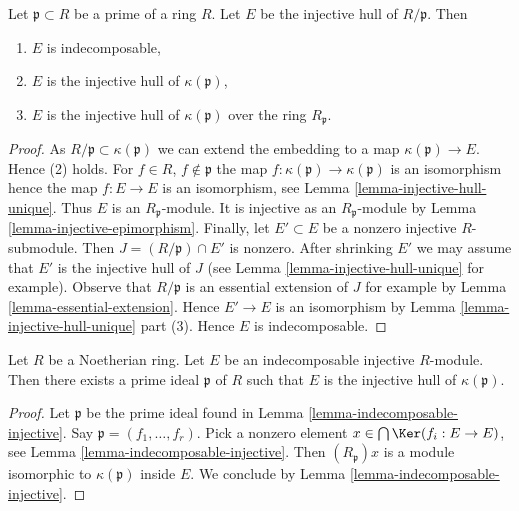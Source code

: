 \begin{lemma}
\label{lemma-injective-hull-indecomposable}
Let $\mathfrak p \subset R$ be a prime of a ring $R$.
Let $E$ be the injective hull of $R/\mathfrak p$. Then
\begin{enumerate}
\item $E$ is indecomposable,
\item $E$ is the injective hull of $\kappa(\mathfrak p)$,
\item $E$ is the injective hull of $\kappa(\mathfrak p)$
over the ring $R_\mathfrak p$.
\end{enumerate}
\end{lemma}

\begin{proof}
As $R/\mathfrak p \subset \kappa(\mathfrak p)$ we can extend the embedding
to a map $\kappa(\mathfrak p) \to E$. Hence (2) holds.
For $f \in R$, $f \not \in \mathfrak p$
the map $f : \kappa(\mathfrak p) \to \kappa(\mathfrak p)$ is an isomorphism
hence the map $f : E \to E$ is an isomorphism,
see Lemma \ref{lemma-injective-hull-unique}.
Thus $E$ is an $R_\mathfrak p$-module. It is injective
as an $R_\mathfrak p$-module by Lemma \ref{lemma-injective-epimorphism}.
Finally, let $E' \subset E$ be a nonzero injective $R$-submodule.
Then $J = (R/\mathfrak p) \cap E'$ is nonzero. After shrinking $E'$
we may assume that $E'$ is the injective hull of $J$ (see
Lemma \ref{lemma-injective-hull-unique} for example).
Observe that $R/\mathfrak p$ is an essential extension of $J$ for example by
Lemma \ref{lemma-essential-extension}. Hence $E' \to E$
is an isomorphism by Lemma \ref{lemma-injective-hull-unique} part (3).
Hence $E$ is indecomposable.
\end{proof}

\begin{lemma}
\label{lemma-indecomposable-injective-noetherian}
Let $R$ be a Noetherian ring. Let $E$ be an indecomposable injective
$R$-module. Then there exists a prime ideal $\mathfrak p$ of $R$ such that
$E$ is the injective hull of $\kappa(\mathfrak p)$.
\end{lemma}

\begin{proof}
Let $\mathfrak p$ be the prime ideal found in
Lemma \ref{lemma-indecomposable-injective}.
Say $\mathfrak p = (f_1, \ldots, f_r)$.
Pick a nonzero element $x \in \bigcap \Ker(f_i : E \to E)$,
see Lemma \ref{lemma-indecomposable-injective}.
Then $(R_\mathfrak p)x$ is a module isomorphic to $\kappa(\mathfrak p)$
inside $E$. We conclude by Lemma \ref{lemma-indecomposable-injective}.
\end{proof}

